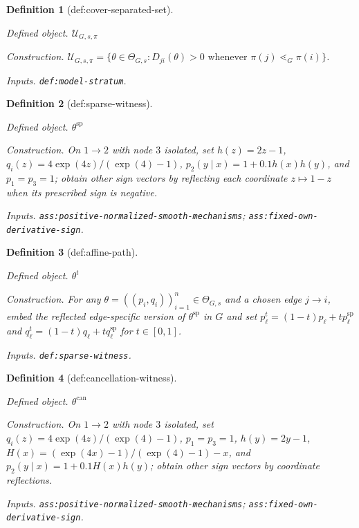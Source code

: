 \documentclass{article}
\newtheorem{definition}{Definition}
\begin{document}
\begin{definition}[def:cover-separated-set]\label{def:cover-separated-set}
\par\smallskip\noindent\emph{Defined object.} \(\mathcal U_{G,s,\pi}\)
\par\smallskip\noindent\emph{Construction.} \(\mathcal U_{G,s,\pi}=\{\theta\in\Theta_{G,s}:D_{ji}(\theta)>0\text{ whenever }\pi(j)\lessdot_G\pi(i)\}\).
\par\smallskip\noindent\emph{Inputs.} \texttt{def:\allowbreak{}model-\allowbreak{}stratum}.
\end{definition}

\begin{definition}[def:sparse-witness]\label{def:sparse-witness}
\par\smallskip\noindent\emph{Defined object.} \(\theta^{\mathrm{sp}}\)
\par\smallskip\noindent\emph{Construction.} On \(1\to2\) with node \(3\) isolated, set \(h(z)=2z-1\), \(q_i(z)=4\exp(4z)/(\exp(4)-1)\), \(p_2(y\mid x)=1+0.1h(x)h(y)\), and \(p_1=p_3=1\); obtain other sign vectors by reflecting each coordinate \(z\mapsto1-z\) when its prescribed sign is negative.
\par\smallskip\noindent\emph{Inputs.} \texttt{ass:\allowbreak{}positive-\allowbreak{}normalized-\allowbreak{}smooth-\allowbreak{}mechanisms}; \texttt{ass:\allowbreak{}fixed-\allowbreak{}own-\allowbreak{}derivative-\allowbreak{}sign}.
\end{definition}

\begin{definition}[def:affine-path]\label{def:affine-path}
\par\smallskip\noindent\emph{Defined object.} \(\theta^t\)
\par\smallskip\noindent\emph{Construction.} For any \(\theta=((p_i,q_i))_{i=1}^{n}\in\Theta_{G,s}\) and a chosen edge \(j\to i\), embed the reflected edge-specific version of \(\theta^{\mathrm{sp}}\) in \(G\) and set \(p_\ell^t=(1-t)p_\ell+t p_\ell^{\mathrm{sp}}\) and \(q_\ell^t=(1-t)q_\ell+t q_\ell^{\mathrm{sp}}\) for \(t\in[0,1]\).
\par\smallskip\noindent\emph{Inputs.} \texttt{def:\allowbreak{}sparse-\allowbreak{}witness}.
\end{definition}

\begin{definition}[def:cancellation-witness]\label{def:cancellation-witness}
\par\smallskip\noindent\emph{Defined object.} \(\theta^{\mathrm{can}}\)
\par\smallskip\noindent\emph{Construction.} On \(1\to2\) with node \(3\) isolated, set \(q_i(z)=4\exp(4z)/(\exp(4)-1)\), \(p_1=p_3=1\), \(h(y)=2y-1\), \(H(x)=(\exp(4x)-1)/(\exp(4)-1)-x\), and \(p_2(y\mid x)=1+0.1H(x)h(y)\); obtain other sign vectors by coordinate reflections.
\par\smallskip\noindent\emph{Inputs.} \texttt{ass:\allowbreak{}positive-\allowbreak{}normalized-\allowbreak{}smooth-\allowbreak{}mechanisms}; \texttt{ass:\allowbreak{}fixed-\allowbreak{}own-\allowbreak{}derivative-\allowbreak{}sign}.
\end{definition}
\end{document}
